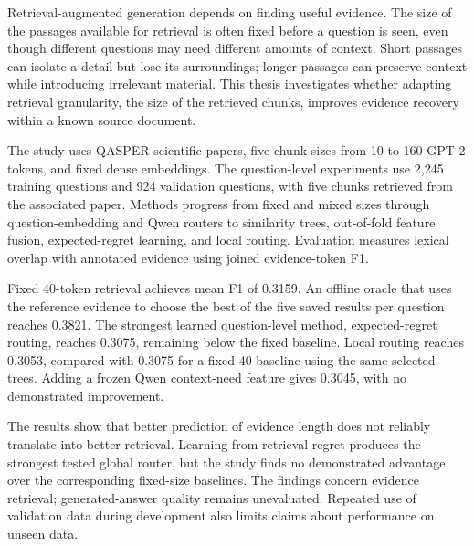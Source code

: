 Retrieval-augmented generation depends on finding useful evidence. The
size of the passages available for retrieval is often fixed before a
question is seen, even though different questions may need different
amounts of context. Short passages can isolate a detail but lose its
surroundings; longer passages can preserve context while introducing
irrelevant material. This thesis investigates whether adapting retrieval
granularity, the size of the retrieved chunks, improves evidence recovery
within a known source document.

The study uses QASPER scientific papers, five chunk sizes from 10 to 160
GPT-2 tokens, and fixed dense embeddings. The question-level experiments
use 2,245 training questions and 924 validation questions, with five
chunks retrieved from the associated paper. Methods progress from fixed
and mixed sizes through question-embedding and Qwen routers to similarity
trees, out-of-fold feature fusion, expected-regret learning, and local
routing. Evaluation measures lexical overlap with annotated evidence
using joined evidence-token F1.

Fixed 40-token retrieval achieves mean F1 of 0.3159. An offline oracle
that uses the reference evidence to choose the best of the five saved
results per question reaches 0.3821. The strongest learned question-level
method, expected-regret routing, reaches 0.3075, remaining below the fixed
baseline. Local routing reaches 0.3053, compared with 0.3075 for a
fixed-40 baseline using the same selected trees. Adding a frozen Qwen
context-need feature gives 0.3045, with no demonstrated improvement.

The results show that better prediction of evidence length does not
reliably translate into better retrieval. Learning from retrieval regret
produces the strongest tested global router, but the study finds no
demonstrated advantage over the corresponding fixed-size baselines.
The findings concern evidence retrieval; generated-answer quality remains
unevaluated. Repeated use of validation data during development also
limits claims about performance on unseen data.
